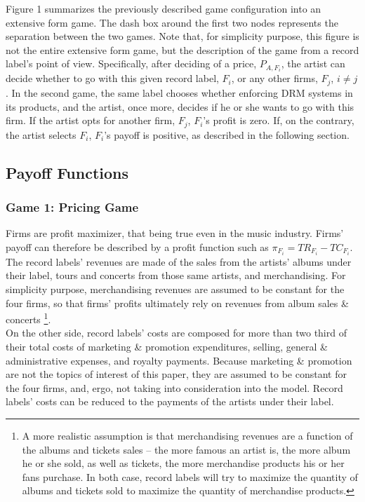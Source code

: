 \documentclass[a4paper,12pt]{article}
\numberwithin{equation}{section}
\begin{document}
Figure 1 summarizes the previously described game configuration into an extensive form game. The dash box around the first two nodes represents the separation between the two games. Note that, for simplicity purpose, this figure is not the entire extensive form game, but the description of the game from a record label's point of view. Specifically, after deciding of a price, $P_{A, F_i}$, the artist can decide whether to go with this given record label, $F_i$, or any other firms, $F_j$, $i \ne j$. In the second game, the same label chooses whether enforcing DRM systems in its products, and the artist, once more, decides if he or she wants to go with this firm. If the artist opts for another firm, $F_j$, $F_i$'s profit is zero. If, on the contrary, the artist selects $F_i$, $F_i$'s payoff is positive, as described in the following section.

\subsection{Payoff Functions}

\subsubsection{Game 1: Pricing Game}

Firms are profit maximizer, that being true even in the music industry. Firms' payoff can therefore be described by a profit function such as $\pi_{F_i} = TR_{F_i} - TC_{F_i}$.\\

The record labels' revenues are made of the sales from the artists' albums under their label, tours and concerts from those same artists, and merchandising. For simplicity purpose, merchandising revenues are assumed to be constant for the four firms, so that firms' profits ultimately rely on revenues from album sales \& concerts \footnote{
A more realistic assumption is that merchandising revenues are a function of the albums and tickets sales – the more famous an artist is, the more album he or she sold, as well as tickets, the more merchandise products his or her fans purchase. In both case, record labels will try to maximize the quantity of albums and tickets sold to maximize the quantity of merchandise products.
}.\\

On the other side, record labels' costs are composed for more than two third of their total costs of marketing \& promotion expenditures, selling, general \& administrative expenses, and royalty payments. Because marketing \& promotion are not the topics of interest of this paper, they are assumed to be constant for the four firms, and, ergo, not taking into consideration into the model. Record labels' costs can be reduced to the payments of the artists under their label.\\
\end{document}
